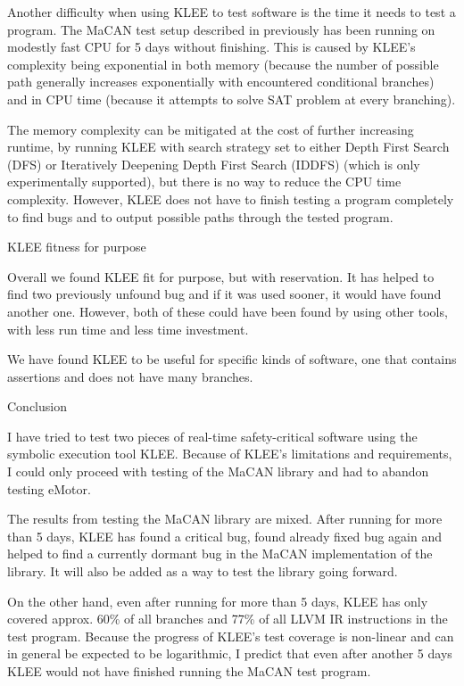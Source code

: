 Another difficulty when using KLEE to test software is the time it needs to
test a program. The MaCAN test setup described in previously has been running
on modestly fast CPU for 5 days without finishing. This is caused by KLEE's
complexity being exponential in both memory (because the number of possible
path generally increases exponentially with encountered conditional branches)
and in CPU time (because it attempts to solve SAT problem at every branching).

The memory complexity can be mitigated at the cost of further increasing
runtime, by running KLEE with search strategy set to either Depth First Search
(DFS) or Iteratively Deepening Depth First Search (IDDFS) (which is only
experimentally supported), but there is no way to reduce the CPU time
complexity. However, KLEE does not have to finish testing a program completely
to find bugs and to output possible paths through the tested program.



\sec KLEE fitness for purpose

Overall we found KLEE fit for purpose, but with reservation. It has helped to
find two previously unfound bug and if it was used sooner, it would have found
another one. However, both of these could have been found by using other tools,
with less run time and less time investment.


We have found KLEE to be useful for specific kinds of software, one that
contains assertions and does not have many branches.



\chap Conclusion

I have tried to test two pieces of real-time safety-critical software using the
symbolic execution tool KLEE. Because of KLEE's limitations and requirements, I
could only proceed with testing of the MaCAN library and had to abandon testing
eMotor.

The results from testing the MaCAN library are mixed. After running for more
than 5 days, KLEE has found a critical bug, found already fixed bug again 
and helped to find a currently dormant bug in the MaCAN implementation of the
library. It will also be added as a way to test the library going forward.

On the other hand, even after running for more than 5 days, KLEE has only
covered approx. 60\% of all branches and 77\% of all LLVM IR instructions
in the test program. Because the progress of KLEE's test coverage is non-linear
and can in general be expected to be logarithmic, I predict that even after
another 5 days KLEE would not have finished running the MaCAN test program.

